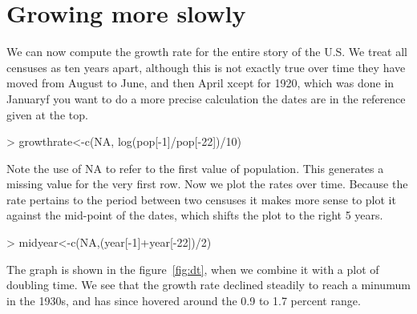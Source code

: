 \documentclass[a4paper]{article}
\begin{document}
\section*{Growing more slowly}

We can now compute the growth rate for the entire story of the U.S. We treat all censuses as ten years apart, although this is not exactly true over time they have moved from August to June, and then April xcept for 1920, which was done in Januaryf you want to do a more precise calculation the dates are in the reference given at the top.
\begin{Schunk}
\begin{Sinput}
> growthrate<-c(NA, log(pop[-1]/pop[-22])/10)
\end{Sinput}
\end{Schunk}
Note the use of NA to refer to the first value of population. This generates a missing value for the very first row. Now we plot the rates over time. Because the rate pertains to the period between two censuses it makes more sense to plot it against the mid-point of the dates, which shifts the plot to the right 5 years.
\begin{Schunk}
\begin{Sinput}
> midyear<-c(NA,(year[-1]+year[-22])/2)
\end{Sinput}
\end{Schunk}
The graph is shown in the figure~\ref{fig:dt}, when we combine it with a plot of doubling time. We see that the growth rate declined steadily to reach a minumum in the 1930s, and has since hovered around the 0.9 to 1.7 percent range.
\end{document}
